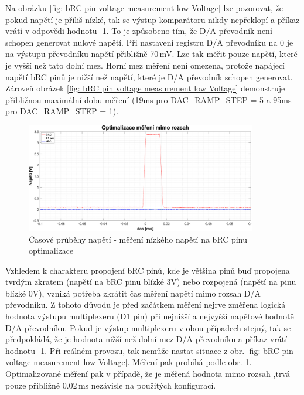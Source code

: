 Na obrázku \ref{fig: bRC pin voltage measurement low Voltage} lze pozorovat, že pokud napětí je příliš nízké, tak se výstup komparátoru nikdy nepřeklopí a 
příkaz vrátí v odpovědi hodnotu -1.
To je způsobeno tím, že D/A převodník není schopen generovat nulové napětí. Při nastavení registru D/A převodníku na 0 je na výstupu převodníku napětí přibližně 70\,mV.
Lze tak měřit pouze napětí, které je vyšší než tato dolní mez. Horní mez měření není omezena, protože napájecí napětí bRC pinů je nižší než napětí,
které je D/A převodník schopen generovat. Zároveň obrázek \ref{fig: bRC pin voltage measurement low Voltage} demonstruje přibližnou maximální dobu
měření (19ms pro DAC\_RAMP\_STEP = 5 a 95ms pro DAC\_RAMP\_STEP = 1). \\

\begin{figure}[ht!]
    \centering
    \includegraphics[width = 0.9\textwidth]{obrazky/matlab_generated/pin_out_of_range_opt.eps}
    \caption{Časové průběhy napětí - měření nízkého napětí na bRC pinu optimalizace}
    \label{fig: bRC pin voltage measurement low Voltage opt}
\end{figure}


Vzhledem k charakteru propojení bRC pinů, kde je většina pinů buď propojena tvrdým zkratem (napětí na bRC pinu blízké 3V) nebo rozpojená (napětí na pinu blízké 0V),
vzniká potřeba zkrátit čas měření napětí mimo rozsah D/A převodníku. Z tohoto důvodu je před začátkem měření nejrve změřena logická hodnota výstupu multiplexeru (D1 pin) při
nejnižší a nejvyšší napěťové hodnotě D/A převodníku. Pokud je výstup multiplexeru v obou případech stejný, tak se předpokládá, že je hodnota nižší než dolní mez D/A převodníku
a příkaz vrátí hodnotu -1. Při reálném provozu, tak nemůže nastat situace z obr. \ref{fig: bRC pin voltage measurement low Voltage}.
Měření pak probíhá podle obr. \ref{fig: bRC pin voltage measurement low Voltage opt}. Optimalizované měření pak v případě, že je měřená hodnota mimo rozsah
,trvá pouze přibližně 0.02\,ms nezávisle na použitých konfigurací.\\

